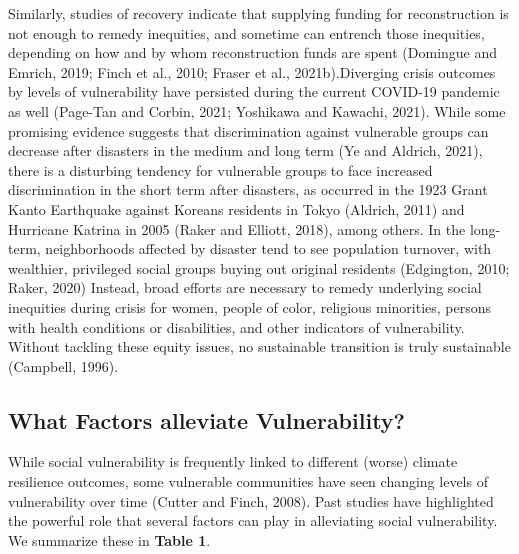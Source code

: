 \documentclass[]{elsarticle} %
\begin{document}
Similarly, studies of recovery indicate that supplying funding for
reconstruction is not enough to remedy inequities, and sometime can
entrench those inequities, depending on how and by whom reconstruction
funds are spent (Domingue and Emrich, 2019; Finch et al., 2010; Fraser
et al., 2021b).Diverging crisis outcomes by levels of vulnerability have
persisted during the current COVID-19 pandemic as well (Page-Tan and
Corbin, 2021; Yoshikawa and Kawachi, 2021). While some promising
evidence suggests that discrimination against vulnerable groups can
decrease after disasters in the medium and long term (Ye and Aldrich,
2021), there is a disturbing tendency for vulnerable groups to face
increased discrimination in the short term after disasters, as occurred
in the 1923 Grant Kanto Earthquake against Koreans residents in Tokyo
(Aldrich, 2011) and Hurricane Katrina in 2005 (Raker and Elliott, 2018),
among others. In the long-term, neighborhoods affected by disaster tend
to see population turnover, with wealthier, privileged social groups
buying out original residents (Edgington, 2010; Raker, 2020) Instead,
broad efforts are necessary to remedy underlying social inequities
during crisis for women, people of color, religious minorities, persons
with health conditions or disabilities, and other indicators of
vulnerability. Without tackling these equity issues, no sustainable
transition is truly sustainable (Campbell, 1996).

\hypertarget{what-factors-alleviate-vulnerability}{%
\subsection{What Factors alleviate
Vulnerability?}\label{what-factors-alleviate-vulnerability}}

While social vulnerability is frequently linked to different (worse)
climate resilience outcomes, some vulnerable communities have seen
changing levels of vulnerability over time (Cutter and Finch, 2008).
Past studies have highlighted the powerful role that several factors can
play in alleviating social vulnerability. We summarize these in
\textbf{Table 1}.
\end{document}
